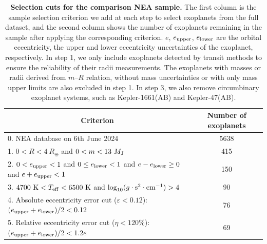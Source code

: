 \documentclass[10pt]{article}
\begin{document}
\begin{table}[!ht]
\centering
\caption{
\textbf{Selection cuts for the comparison NEA sample.}
The first column is the sample selection criterion we add at each step to select exoplanets from the full dataset, and the second column shows the number of exoplanets remaining in the sample after applying the corresponding criterion.
$e$, $e_{\rm upper}$, $e_{\rm lower}$ are the orbital eccentricity, the upper and lower eccentricity uncertainties of the exoplanet, respectively.
In step 1, we only include exoplanets detected by transit methods to ensure the reliability of their radii measurements.
The exoplanets with masses or radii derived from $m$--$R$ relation, without mass uncertainties or with only mass upper limits are also excluded in step 1.
In step 3, we also remove circumbinary exoplanet systems, such as Kepler-1661(AB) and Kepler-47(AB).
}
\begin{tabular}{lc}
\\
\hline
\multicolumn{1}{c}{Criterion}        & Number of exoplanets \\
\hline
0. NEA database on 6th June 2024          & 5638         \\
1. $0<R<4~R_\oplus$ and $0<m<13~M_{\rm J}$  & 415 \\
2. $0 < e_{\rm upper} <1$ and $0 \leq e_{\rm lower} <1$ and $e-e_{\rm lower}\geq 0$ and $e+e_{\rm upper}<1$ & 150  \\
3. $4700~{\rm K} < T_{\rm eff} < 6500~{\rm K}$ and $\log_{10}(g\cdot{\rm s}^2\cdot{\rm cm}^{-1})>4$ & 90  \\
4. Absolute eccentricity error cut ($\varepsilon<0.12$): $(e_{\rm upper} +  e_{\rm lower})/2 <0.12$ & 76 \\
5. Relative eccentricity error cut ($\eta<120\%$): ${(e_{\rm upper} + e_{\rm lower})/2} <1.2e$ & 69   \\
\hline
\end{tabular}
\label{ts2}
\end{table}
\end{document}

